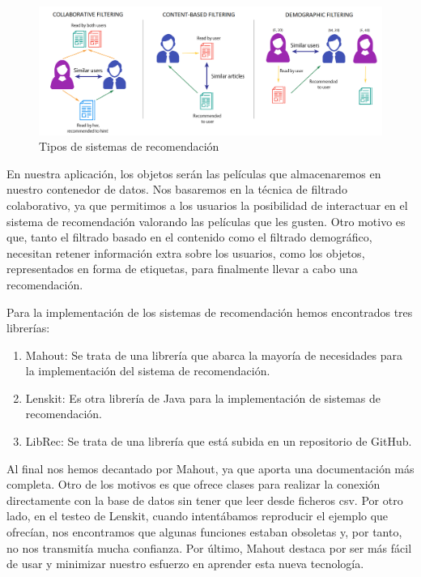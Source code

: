 \begin{figure}[H]
    \centering
    \includegraphics[width=6in, angle=0]{figures/chapter-2/recommendation_systems.png}
    \caption{Tipos de sistemas de recomendación \cite{imagefilters}}
\end{figure}

En nuestra aplicación, los objetos serán las películas que almacenaremos en nuestro contenedor de datos. Nos basaremos en 
la técnica de filtrado colaborativo, ya que permitimos a los usuarios la posibilidad de 
interactuar en el sistema de recomendación valorando las películas que les gusten. Otro motivo es que, tanto el filtrado basado
en el contenido como el filtrado demográfico, necesitan retener información extra sobre los usuarios, como los objetos, representados 
en forma de etiquetas, para finalmente llevar a cabo una recomendación.

Para la implementación de los sistemas de recomendación hemos encontrados tres librerías:
\begin{enumerate}
    \item Mahout: Se trata de una librería que abarca la mayoría de necesidades para la implementación del sistema de recomendación.
    \item Lenskit: Es otra librería de Java para la implementación de sistemas de recomendación.
    \item LibRec: Se trata de una librería que está subida en un repositorio de GitHub.
\end{enumerate}

Al final nos hemos decantado por Mahout, ya que aporta una documentación más completa. Otro de los motivos es que ofrece clases para realizar la conexión directamente con la base de datos 
sin tener que leer desde ficheros csv. Por otro lado, en el testeo de 
Lenskit, cuando intentábamos reproducir el ejemplo que ofrecían, nos encontramos que algunas funciones estaban 
obsoletas y, por tanto, no nos transmitía mucha confianza. Por último, Mahout destaca por ser más fácil de usar y minimizar nuestro esfuerzo en aprender esta nueva tecnología.

